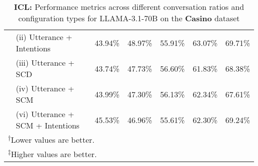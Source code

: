 \begin{table*}[ht]
\begin{tabular}{llccccc}
 & (ii) Utterance + Intentions & \cellcolor{red!25}43.94\% & \cellcolor{green!25}48.97\% & \cellcolor{red!25}55.91\% & \cellcolor{green!25}63.07\% & \cellcolor{green!25}69.71\% \\
 & (iii) Utterance + SCD & \cellcolor{red!25}43.74\% & \cellcolor{red!25}47.73\% & \cellcolor{red!25}56.60\% & \cellcolor{red!25}61.83\% & \cellcolor{red!25}68.38\% \\
 & (iv) Utterance + SCM & \cellcolor{red!25}43.99\% & \cellcolor{red!25}47.30\% & \cellcolor{red!25}56.13\% & \cellcolor{red!25}62.34\% & \cellcolor{red!25}67.61\% \\
 & (vi) Utterance + SCM + Intentions & \cellcolor{green!25}45.53\% & \cellcolor{red!25}46.96\% & \cellcolor{red!25}55.61\% & \cellcolor{red!25}62.30\% & \cellcolor{green!25}69.24\% \\
\hline
\multicolumn{7}{l}{\textsuperscript{$\dagger$}Lower values are better.}\\
\multicolumn{7}{l}{\textsuperscript{$\ddagger$}Higher values are better.}\\
\end{tabular}
\caption{\textbf{ICL: }Performance metrics across different conversation ratios and configuration types for LLAMA-3.1-70B on the \textbf{Casino} dataset}
\label{tab:combined_metrics_icl_llama_casino_by_ratio}
\end{table*}